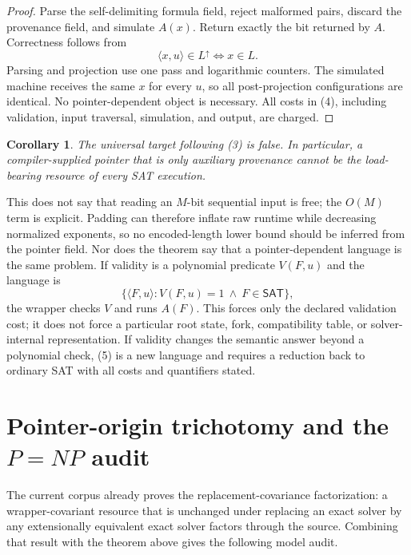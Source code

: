 \documentclass[11pt]{article}
\newtheorem{corollary}{Corollary}
\newcommand{\SAT}{\mathsf{SAT}}
\begin{document}
\begin{proof}
Parse the self-delimiting formula field, reject malformed pairs, discard the provenance field, and simulate $A(x)$.  Return exactly the bit returned by $A$.  Correctness follows from
\[
 \langle x,u\rangle\in L^{\uparrow}\Longleftrightarrow x\in L.
\]
Parsing and projection use one pass and logarithmic counters.  The simulated machine receives the same $x$ for every $u$, so all post-projection configurations are identical.  No pointer-dependent object is necessary.  All costs in (4), including validation, input traversal, simulation, and output, are charged.
\end{proof}

\begin{corollary}
The universal target following (3) is false.  In particular, a compiler-supplied pointer that is only auxiliary provenance cannot be the load-bearing resource of every SAT execution.
\end{corollary}

This does not say that reading an $M$-bit sequential input is free; the $O(M)$ term is explicit.  Padding can therefore inflate raw runtime while decreasing normalized exponents, so no encoded-length lower bound should be inferred from the pointer field.  Nor does the theorem say that a pointer-dependent language is the same problem.  If validity is a polynomial predicate $V(F,u)$ and the language is
\[
 \{\langle F,u\rangle:V(F,u)=1\ \wedge\ F\in\SAT\},
 \tag{5}
\]
the wrapper checks $V$ and runs $A(F)$.  This forces only the declared validation cost; it does not force a particular root state, fork, compatibility table, or solver-internal representation.  If validity changes the semantic answer beyond a polynomial check, (5) is a new language and requires a reduction back to ordinary SAT with all costs and quantifiers stated.

\section{Pointer-origin trichotomy and the $P=NP$ audit}

The current corpus already proves the replacement-covariance factorization: a wrapper-covariant resource that is unchanged under replacing an exact solver by any extensionally equivalent exact solver factors through the source.  Combining that result with the theorem above gives the following model audit.
\end{document}
